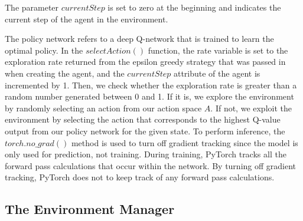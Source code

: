 \documentclass[12pt,oneside]{article}
\begin{document}
The parameter $currentStep$ is set to zero at the beginning and indicates the current step of the agent in the environment.

The policy network refers to a deep Q-network that is trained to learn the optimal policy. In the $selectAction()$ function, the rate variable is set to the exploration rate returned from the epsilon greedy strategy that was passed in when creating the agent, and the $currentStep$ attribute of the agent is incremented by 1. 
Then, we check whether the exploration rate is greater than a random number generated between 0 and 1. If it is, we explore the environment by randomly selecting an action from our action space $A$. If not, we exploit the environment by selecting the action that corresponds to the highest Q-value output from our policy network for the given state. To perform inference, the $torch.no\_grad()$ method is used to turn off gradient tracking since the model is only used for prediction, not training. During training, PyTorch tracks all the forward pass calculations that occur within the network. By turning off gradient tracking,  PyTorch does not to keep track of any forward pass calculations.

\subsection{The Environment Manager}
\end{document}

